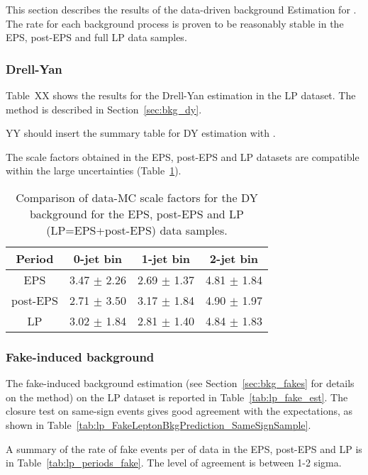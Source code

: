 This section describes the results of the data-driven background Estimation for \lpintlumi. 
The rate for each background process is proven to be reasonably stable in the EPS, post-EPS and full LP data samples.

\subsubsection{Drell-Yan}

Table~XX shows the results for the Drell-Yan estimation in the LP dataset. 
The method is described in Section~\ref{sec:bkg_dy}.

YY should insert the summary table for DY estimation with \lpintlumi.

The scale factors obtained in the EPS, post-EPS and LP datasets are compatible within the large uncertainties (Table~\ref{tab:lp_periods_dy}).

\begin{table}[!htbp]
\begin{center}
\begin{tabular}{c c c c} 
\hline
Period & 0-jet bin & 1-jet bin & 2-jet bin \\ 
\hline
EPS      & 3.47 $\pm$ 2.26 & 2.69 $\pm$ 1.37 & 4.81 $\pm$ 1.84 \\
post-EPS & 2.71 $\pm$ 3.50 & 3.17 $\pm$ 1.84 & 4.90 $\pm$ 1.97 \\
LP       & 3.02 $\pm$ 1.84 & 2.81 $\pm$ 1.40 & 4.84 $\pm$ 1.83 \\
\hline
\end{tabular}
\caption{Comparison of data-MC scale factors for the DY background for the EPS, post-EPS and LP (LP=EPS+post-EPS) data samples.}
\label{tab:lp_periods_dy}
\end{center}
\end{table}


\subsubsection{Fake-induced background}

The fake-induced background estimation (see Section~\ref{sec:bkg_fakes} for details on the method) 
on the LP dataset is reported in Table~\ref{tab:lp_fake_est}.
The closure test on same-sign events gives good agreement with the expectations, as shown in Table~\ref{tab:lp_FakeLeptonBkgPrediction_SameSignSample}.

A summary of the rate of fake events per \ifb of data in the EPS, post-EPS and LP is in Table~\ref{tab:lp_periods_fake}. 
The level of agreement is between 1-2 sigma.

